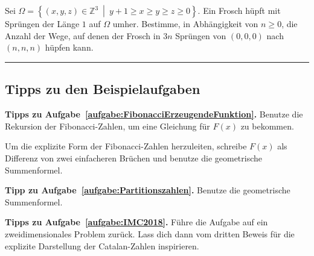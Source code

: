 \begin{aufgabe*}[*]\label{aufgabe:IMC2018}
	Sei $\Omega=\left\{(x,y,z)\in\mathbb Z^3\ \middle|\ y+1\geqslant x\geqslant y\geqslant z\geqslant 0\right\}$. Ein Frosch hüpft mit Sprüngen der Länge $1$ auf $\Omega$ umher. Bestimme, in Abhängigkeit von $n\geqslant 0$, die Anzahl der Wege, auf denen der Frosch in $3n$ Sprüngen von $(0,0,0)$ nach $(n,n,n)$ hüpfen kann.
\end{aufgabe*}


\vfill\hrule\vspace{-1em}

\subsection*{Tipps zu den Beispielaufgaben}
\textbf{Tipps zu Aufgabe~\ref{aufgabe:FibonacciErzeugendeFunktion}.} Benutze die Rekursion der Fibonacci-Zahlen, um eine Gleichung für $F(x)$ zu bekommen.

Um die explizite Form der Fibonacci-Zahlen herzuleiten, schreibe $F(x)$ als Differenz von zwei einfacheren Brüchen und benutze die geometrische Summenformel.

\textbf{Tipp zu Aufgabe~\ref{aufgabe:Partitionszahlen}.} Benutze die geometrische Summenformel.

\textbf{Tipps zu Aufgabe~\ref{aufgabe:IMC2018}.} Führe die Aufgabe auf ein zweidimensionales Problem zurück. Lass dich dann vom dritten Beweis für die explizite Darstellung der Catalan-Zahlen inspirieren.

